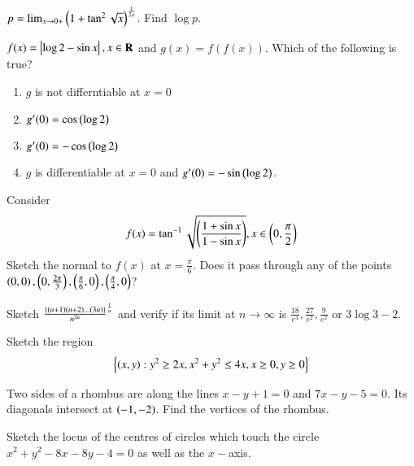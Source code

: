 \documentclass[journal,12pt,onecolumn]{IEEEtran}
\begin{document}
\solution

\begin{problem}
$p = \lim_{x \rightarrow 0+}\left(1+\tan^2\sqrt{x}\right)^{\frac{1}{2x}}$. Find  $\log p$.
\end{problem}
\begin{problem}
$f(x) = \left\vert\log 2 - \sin x\right\vert, x \in \mathbf{R}$ and $g(x)=f(f(x))$.  Which of the following is true?
\begin{enumerate}
\item $g$ is not differntiable at $x=0$
\item $g^{\prime}(0) = \cos \left(\log 2\right)$
\item $g^{\prime}(0) = -\cos \left(\log 2\right)$
\item $g$ is differentiable at $x=0$ and $g^{\prime }(0) = -\sin \left(\log 2\right)$.
\end{enumerate}
\end{problem}
\solution

\begin{problem}
Consider 
\begin{equation*}
f(x) = \tan^{-1}\sqrt{\left(\frac{1+\sin x }{1-\sin x}\right)}, x \in \left(0,\frac{\pi}{2}\right)
\end{equation*}
Sketch the normal to $f(x)$ at $x = \frac{\pi}{6}$. Does it pass through any of the points $\left(0,0\right),\left(0,\frac{2\pi}{3}\right),\left(\frac{\pi}{6},0\right),\left(\frac{\pi}{4},0\right)$?
\end{problem}
\solution

\begin{problem}
Sketch $\frac{\left\{\left(n+1\right)\left(n+2\right)\dots \left(3n\right)\right\}}{n^{2n}}^{\frac{1}{n}}$ and verify if its limit at $n \rightarrow \infty $ is $\frac{18}{e^4},\frac{27}{e^2},\frac{9}{e^2}$ or $3\log 3 -2$.
\end{problem}
\begin{problem}
Sketch the region 
\begin{equation*}
\left\{\left(x,y\right): y^2 \geq 2x, x^2+y^2 \leq 4x, x \geq 0, y \geq 0 \right\}
\end{equation*}
\end{problem}
\solution

\begin{problem}
Two sides of a rhombus are along the lines $x-y+1 = 0$ and $7x-y-5=0$. Its diagonals intersect at $\left(-1,-2\right)$. Find the vertices of the rhombus.
\end{problem}
\solution

\begin{problem}
Sketch the locus of the centres of circles which touch the circle $x^2+y^2-8x-8y-4=0$ as well as the $x-$axis. 
\end{problem}
\end{document}
